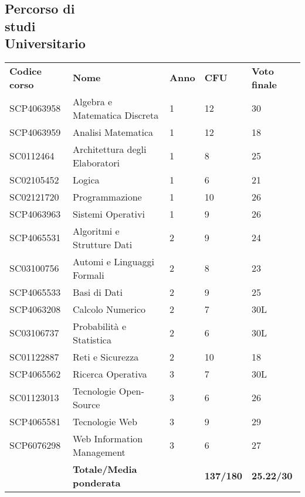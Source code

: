 \documentclass[margin, 10pt]{res}
\begin{document}
\begin{resume}
\section{Percorso di \\ studi \\ Universitario}
\begin{longtable}{lllll}
\textbf{Codice corso} & \textbf{Nome}                   & \textbf{Anno} & \textbf{CFU}     & \textbf{Voto finale} \\
SCP4063958            & Algebra e Matematica Discreta   & 1             & 12               & 30                   \\
SCP4063959            & Analisi Matematica              & 1             & 12               & 18                   \\
SC0112464             & Architettura degli Elaboratori  & 1             & 8                & 25                   \\
SC02105452            & Logica                          & 1             & 6                & 21                   \\
SC02121720            & Programmazione                  & 1             & 10               & 26                   \\
SCP4063963            & Sistemi Operativi               & 1             & 9                & 26                   \\
SCP4065531            & Algoritmi e Strutture Dati      & 2             & 9                & 24                   \\
SC03100756            & Automi e Linguaggi Formali      & 2             & 8                & 23                   \\
SCP4065533            & Basi di Dati                    & 2             & 9                & 25                   \\
SCP4063208            & Calcolo Numerico                & 2             & 7                & 30L                  \\
SC03106737            & Probabilità e Statistica        & 2             & 6                & 30L                  \\
SC01122887            & Reti e Sicurezza                & 2             & 10               & 18                   \\
SCP4065562            & Ricerca Operativa               & 3             & 7                & 30L                  \\
SC01123013            & Tecnologie Open-Source          & 3             & 6                & 26                   \\
SCP4065581            & Tecnologie Web                  & 3             & 9                & 29                   \\
SCP6076298            & Web Information Management      & 3             & 6                & 27                   \\
\textbf{}             & \textbf{Totale/Media ponderata} & \textbf{}     & \textbf{137/180} & \textbf{25.22/30}   
\end{longtable}


\end{resume}
\end{document}
